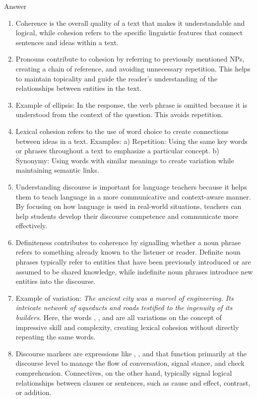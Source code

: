 \begin{tblsfilled}{Answer}

\begin{enumerate}[noitemsep, leftmargin=*]
    \item Coherence is the overall quality of a text that makes it understandable and logical, while cohesion refers to the specific linguistic features that connect sentences and ideas within a text.
    \item Pronouns contribute to cohesion by referring to previously mentioned NPs, creating a chain of reference, and avoiding unnecessary repetition. This helps to maintain topicality and guide the reader's understanding of the relationships between entities in the text.
    \item Example of ellipsis:   In the response, the verb phrase  is omitted because it is understood from the context of the question. This avoids repetition.
    \item Lexical cohesion refers to the use of word choice to create connections between ideas in a text. Examples: a) Repetition: Using the same key words or phrases throughout a text to emphasize a particular concept. b) Synonymy: Using words with similar meanings to create variation while maintaining semantic links.
    \item Understanding discourse is important for language teachers because it helps them to teach language in a more communicative and context-aware manner. By focusing on how language is used in real-world situations, teachers can help students develop their discourse competence and communicate more effectively.
    \item Definiteness contributes to coherence by signalling whether a noun phrase refers to something already known to the listener or reader. Definite noun phrases typically refer to entities that have been previously introduced or are assumed to be shared knowledge, while indefinite noun phrases introduce new entities into the discourse.
    \item Example of variation: \textit{The ancient city was a marvel of engineering. Its intricate network of aqueducts and roads testified to the ingenuity of its builders.} Here, the words , , and  are all variations on the concept of impressive skill and complexity, creating lexical cohesion without directly repeating the same words.
    \item Discourse markers are expressions like , , and  that function primarily at the discourse level to manage the flow of conversation, signal stance, and check comprehension. Connectives, on the other hand, typically signal logical relationships between clauses or sentences, such as cause and effect, contrast, or addition.

\end{enumerate}
\end{tblsfilled}
